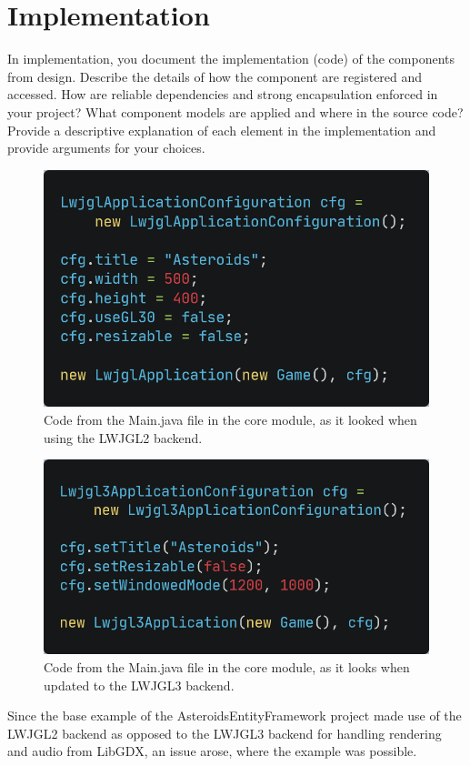 \section{Implementation}
In implementation, you document the implementation (code) of the components from
design.
Describe the details of how the component are registered and accessed.
How are reliable dependencies and strong encapsulation enforced in your project?
What component models are applied and where in the source code?
Provide a descriptive explanation of each element in the implementation and 
provide arguments for your choices.
\\
\begin{figure}
    \includegraphics[width=\textwidth]{images/code/lwjgl2backend.png}
    \caption{Code from the Main.java file in the core module, as it looked when using the LWJGL2 backend.}
\end{figure}
\begin{figure}
    \includegraphics[width=\textwidth]{images/code/lwjgl3backend.png}
    \caption{Code from the Main.java file in the core module, as it looks when updated to the LWJGL3 backend.}
    
\end{figure}

Since the base example of the AsteroidsEntityFramework project made use of the
LWJGL2 backend as opposed to the LWJGL3 backend for handling rendering and audio
from LibGDX, an issue arose, where the example was possible. 